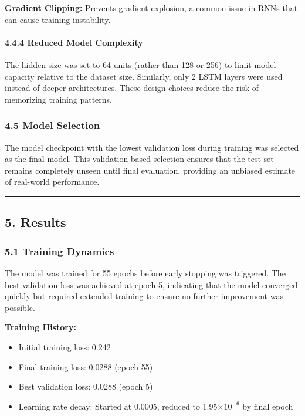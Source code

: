 \documentclass[
]{article}
\begin{document}
\textbf{Gradient Clipping:} Prevents gradient explosion, a common issue
in RNNs that can cause training instability.

\paragraph{4.4.4 Reduced Model
Complexity}\label{444-reduced-model-complexity}

The hidden size was set to 64 units (rather than 128 or 256) to limit
model capacity relative to the dataset size. Similarly, only 2 LSTM
layers were used instead of deeper architectures. These design choices
reduce the risk of memorizing training patterns.

\subsubsection{4.5 Model Selection}\label{45-model-selection}

The model checkpoint with the lowest validation loss during training was
selected as the final model. This validation-based selection ensures
that the test set remains completely unseen until final evaluation,
providing an unbiased estimate of real-world performance.

\begin{center}\rule{0.5\linewidth}{0.5pt}\end{center}

\subsection{5. Results}\label{5-results}

\subsubsection{5.1 Training Dynamics}\label{51-training-dynamics}

The model was trained for 55 epochs before early stopping was triggered.
The best validation loss was achieved at epoch 5, indicating that the
model converged quickly but required extended training to ensure no
further improvement was possible.

\textbf{Training History:}

\begin{itemize}
\item
  Initial training loss: 0.242
\item
  Final training loss: 0.0288 (epoch 55)
\item
  Best validation loss: 0.0288 (epoch 5)
\item
  Learning rate decay: Started at 0.0005, reduced to 1.95×$10^{-6}$ by final
  epoch
\end{itemize}
\end{document}
